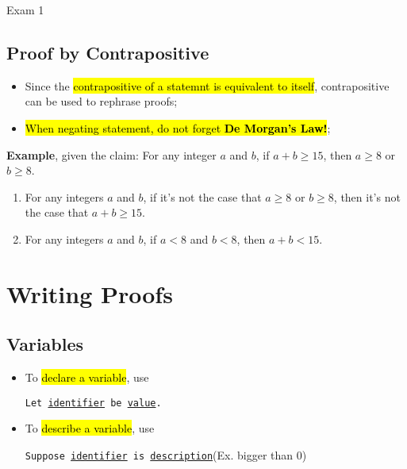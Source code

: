 \documentclass{note}
\begin{document}
\begin{note}{Exam 1}
        \subsection{Proof by Contrapositive}

        \begin{itemize}
            \item Since the \hl{contrapositive of a statemnt is equivalent to itself}, contrapositive
            can be used to rephrase proofs;
            \item \hl{When negating statement, do not forget \textbf{De Morgan's Law!}};
        \end{itemize}

        \textbf{Example}, given the claim: For any integer $ a $ and $ b $, if  $ a+b \geq 15 $, then $ a \geq 8 $ or $ b \geq 8 $.
        \begin{enumerate}
            \item For any integers $ a $ and $ b $, if it’s not the case that  $ a \geq 8 $ or $ b \geq 8 $, 
            then it’s not the case that $ a + b \geq 15 $.
            \item For any integers $ a $ and $ b $, if $ a < 8 $ and $ b < 8 $, then $ a + b < 15 $.
        \end{enumerate}

        \section{Writing Proofs}

        \subsection{Variables}

        \begin{itemize}
            \item To \hl{declare a variable}, use 
            \begin{center}
                \texttt{Let \underline{identifier} be \underline{value}.}
            \end{center}

            \item To \hl{describe a variable}, use 
            \begin{center}
                \texttt{Suppose \underline{identifier} is \underline{description}}(Ex. bigger than 0)
            \end{center}
        \end{itemize}
        
    \end{note}
\end{document}
